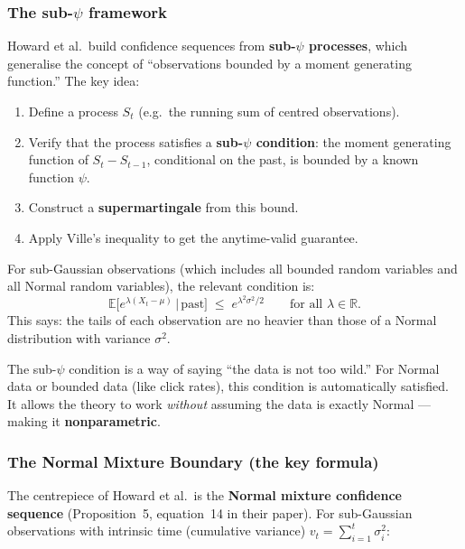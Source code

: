 \documentclass[12pt, a4paper]{article}
\newcommand{\E}{\mathbb{E}}            %
\newcommand{\given}{\,\vert\,}         %
\newcommand{\R}{\mathbb{R}}
\begin{document}
\subsubsection*{The sub-$\psi$ framework}

Howard et al.\ build confidence sequences from \textbf{sub-$\psi$ processes},
which generalise the concept of ``observations bounded by a moment generating
function.''  The key idea:

\begin{enumerate}[nosep]
  \item Define a process $S_t$ (e.g.\ the running sum of centred observations).
  \item Verify that the process satisfies a \textbf{sub-$\psi$ condition}:
        the moment generating function of $S_t - S_{t-1}$, conditional on the
        past, is bounded by a known function $\psi$.
  \item Construct a \textbf{supermartingale} from this bound.
  \item Apply Ville's inequality to get the anytime-valid guarantee.
\end{enumerate}

For sub-Gaussian observations (which includes all bounded random variables
and all Normal random variables), the relevant condition is:
\[
  \E\!\bigl[e^{\lambda(X_t - \mu)} \given \text{past}\bigr]
  \;\leq\;
  e^{\lambda^2 \sigma^2 / 2}
  \qquad \text{for all } \lambda \in \R.
\]
This says: the tails of each observation are no heavier than those of a Normal
distribution with variance $\sigma^2$.

\begin{plainlanguage}
The sub-$\psi$ condition is a way of saying ``the data is not too wild.''
For Normal data or bounded data (like click rates), this condition is
automatically satisfied.  It allows the theory to work \emph{without}
assuming the data is exactly Normal --- making it \textbf{nonparametric}.
\end{plainlanguage}

\subsubsection*{The Normal Mixture Boundary (the key formula)}

The centrepiece of Howard et al.\ is the \textbf{Normal mixture confidence
sequence} (Proposition~5, equation~14 in their paper).  For sub-Gaussian
observations with intrinsic time (cumulative variance) $v_t = \sum_{i=1}^t
\sigma_i^2$:
\end{document}
